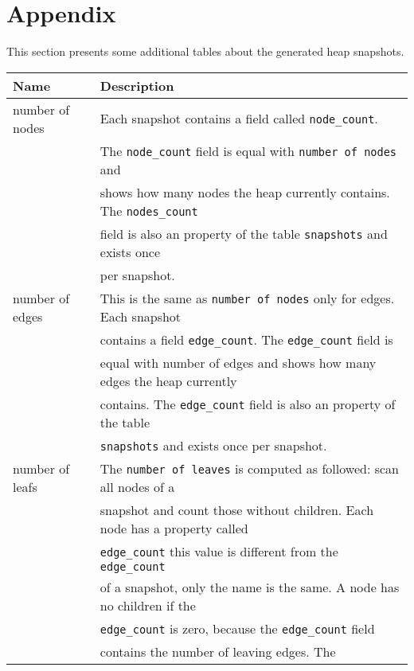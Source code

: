 \section{Appendix}

This section presents some additional tables about the generated heap snapshots.

\begin{table}[!htbp]
	\centering
	\begin{tabular}{|l||l|}
		\hline
		\textbf{Name}	&	\textbf{Description}				\\ \hline \hline
		number of nodes & Each snapshot contains a field 
						  called \texttt{node\_count}.  			\\
						& The \texttt{node\_count} field is equal 
						  with \texttt{number of nodes} and			\\
						& shows how many nodes the heap currently 
						  contains. The \texttt{nodes\_count} 		\\
						& field is also an property of the table
						  \texttt{snapshots} and exists once		\\
						& per snapshot.								\\ \hline
		number of edges	& This is the same as \texttt{number of nodes} 
						  only for edges. Each snapshot 			\\
						& contains a field \texttt{edge\_count}. 
						  The \texttt{edge\_count} field is 		\\
						& equal with number of edges and shows how 
						  many edges the heap currently 			\\
						& contains. The \texttt{edge\_count} field 
						  is also an property of the table 			\\
						& \texttt{snapshots} and exists once per 
						  snapshot.									\\ \hline
		number of leafs	& The \texttt{number of leaves} is computed 
						  as followed: scan all nodes of a 			\\
						& snapshot and count those without children. 
						  Each node has a property called 			\\
						& \texttt{edge\_count} this value is 
						  different from the \texttt{edge\_count} 	\\
						& of a snapshot, only the name is the same. 
						  A node has no children if the 			\\
						& \texttt{edge\_count} is zero, because the
						  \texttt{edge\_count} field 				\\
						& contains the number of leaving edges. The

\end{tabular}
\end{table}
